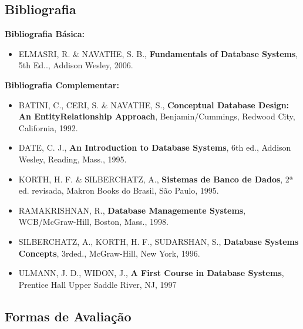 \documentclass[12pt, a4paper]{article}
\begin{document}
\subsection{Bibliografia} \label{subsec:bibliografia}




\textbf{Bibliografia Básica:}

\begin{itemize}
    \item ELMASRI, R. \& NAVATHE, S. B., \textbf{Fundamentals of Database Systems}, 5th Ed.., Addison Wesley, 2006.
\end{itemize}

\textbf{Bibliografia Complementar:}

\begin{itemize}
    \item BATINI, C., CERI, S. \& NAVATHE, S., \textbf{Conceptual Database Design: An EntityRelationship Approach}, Benjamin/Cummings, Redwood City, California, 1992.
    \item DATE, C. J., \textbf{An Introduction to Database Systems}, 6th ed., Addison Wesley, Reading, Mass., 1995.
    \item KORTH, H. F. \& SILBERCHATZ, A., \textbf{Sistemas de Banco de Dados}, 2ª ed. revisada, Makron Books do Brasil, São Paulo, 1995.
    \item RAMAKRISHNAN, R., \textbf{Database Managemente Systems}, WCB/McGraw-Hill, Boston, Mass., 1998.
    \item SILBERCHATZ, A., KORTH, H. F., SUDARSHAN, S., \textbf{Database Systems Concepts}, 3rded., McGraw-Hill, New York, 1996.
    \item ULMANN, J. D., WIDON, J., \textbf{A First Course in Database Systems}, Prentice Hall Upper Saddle River, NJ, 1997
\end{itemize}

\subsection{Formas de Avaliação} \label{subsec:avaliacoes}
\end{document}
